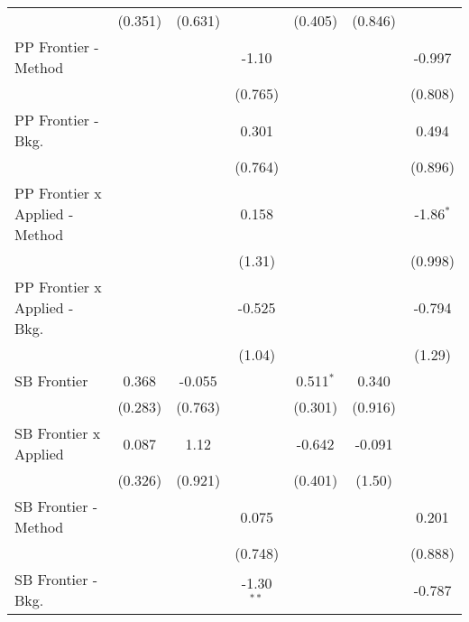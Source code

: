 \begin{tabular}{lcccccc}
                                  & (0.351)       & (0.631)       &               & (0.405)        & (0.846)       &   \\   
   PP Frontier - Method           &               &               & -1.10         &                &               & -0.997\\   
                                  &               &               & (0.765)       &                &               & (0.808)\\   
   PP Frontier - Bkg.             &               &               & 0.301         &                &               & 0.494\\   
                                  &               &               & (0.764)       &                &               & (0.896)\\   
   PP Frontier x Applied - Method &               &               & 0.158         &                &               & -1.86$^{*}$\\   
                                  &               &               & (1.31)        &                &               & (0.998)\\   
   PP Frontier x Applied - Bkg.   &               &               & -0.525        &                &               & -0.794\\   
                                  &               &               & (1.04)        &                &               & (1.29)\\   
   SB Frontier                    & 0.368         & -0.055        &               & 0.511$^{*}$    & 0.340         &   \\   
                                  & (0.283)       & (0.763)       &               & (0.301)        & (0.916)       &   \\   
   SB Frontier x Applied          & 0.087         & 1.12          &               & -0.642         & -0.091        &   \\   
                                  & (0.326)       & (0.921)       &               & (0.401)        & (1.50)        &   \\   
   SB Frontier - Method           &               &               & 0.075         &                &               & 0.201\\   
                                  &               &               & (0.748)       &                &               & (0.888)\\   
   SB Frontier - Bkg.             &               &               & -1.30$^{**}$  &                &               & -0.787\\   

\end{tabular}
